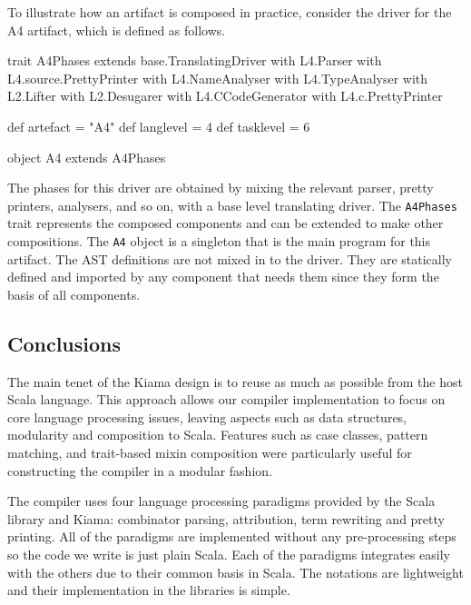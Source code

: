 To illustrate how an artifact is composed in practice, consider the driver for the A4 artifact, which is defined as follows.

\begin{scala}
  trait A4Phases extends base.TranslatingDriver
      with L4.Parser
      with L4.source.PrettyPrinter
      with L4.NameAnalyser
      with L4.TypeAnalyser
      with L2.Lifter
      with L2.Desugarer
      with L4.CCodeGenerator
      with L4.c.PrettyPrinter {
  
      def artefact = "A4"
      def langlevel = 4
      def tasklevel = 6
  
  }

  object A4 extends A4Phases  
\end{scala}

\noindent
The phases for this driver are obtained by mixing the relevant parser, pretty printers, analysers, and so on, with a base level translating driver.
The \verb|A4Phases| trait represents the composed components and can be extended to make other compositions.
The \verb|A4| object is a singleton that is the main program for this artifact.
The AST definitions are not mixed in to the driver.
They are statically defined and imported by any component that needs them since they form the basis of all components.

\subsection{Conclusions}
\label{sec:kiama-observe}

The main tenet of the Kiama design is to reuse as much as possible from the host Scala language.
This approach allows our compiler implementation to focus on core language processing issues, leaving aspects such as data structures, modularity and composition to Scala.
Features such as case classes, pattern matching, and trait-based mixin composition were particularly useful for constructing the compiler in a modular fashion.

The compiler uses four language processing paradigms provided by the Scala library and Kiama: combinator parsing, attribution, term rewriting and pretty printing.
All of the paradigms are implemented without any pre-processing steps so the code we write is just plain Scala.
Each of the paradigms integrates easily with the others due to their common basis in Scala.
The notations are lightweight and their implementation in the libraries is simple.

